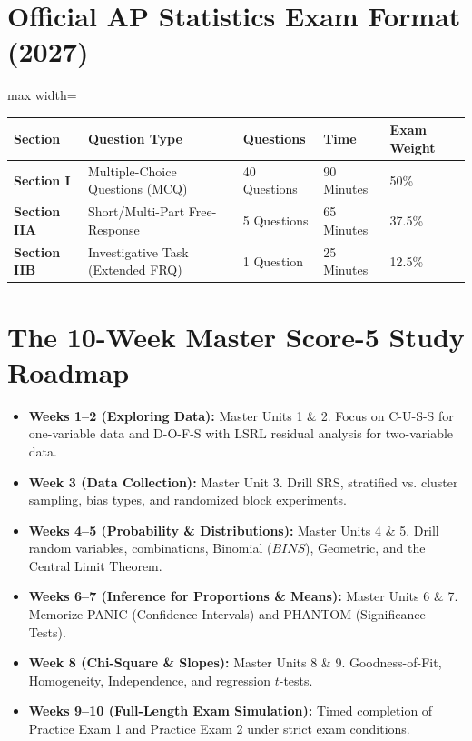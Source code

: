 \section*{Official AP Statistics Exam Format (2027)}
\begin{adjustbox}{max width=\linewidth}
\begin{tabular}{lllll}
\toprule
\textbf{Section} & \textbf{Question Type} & \textbf{Questions} & \textbf{Time} & \textbf{Exam Weight} \\
\midrule
\textbf{Section I} & Multiple-Choice Questions (MCQ) & 40 Questions & 90 Minutes & 50\% \\
\textbf{Section IIA} & Short/Multi-Part Free-Response & 5 Questions & 65 Minutes & 37.5\% \\
\textbf{Section IIB} & Investigative Task (Extended FRQ) & 1 Question & 25 Minutes & 12.5\% \\
\bottomrule
\end{tabular}
\end{adjustbox}

\section*{The 10-Week Master Score-5 Study Roadmap}
\begin{itemize}[leftmargin=1.2em]
  \item \textbf{Weeks 1--2 (Exploring Data):} Master Units 1 \& 2. Focus on C-U-S-S for one-variable data and D-O-F-S with LSRL residual analysis for two-variable data.
  \item \textbf{Week 3 (Data Collection):} Master Unit 3. Drill SRS, stratified vs. cluster sampling, bias types, and randomized block experiments.
  \item \textbf{Weeks 4--5 (Probability \& Distributions):} Master Units 4 \& 5. Drill random variables, combinations, Binomial ($BINS$), Geometric, and the Central Limit Theorem.
  \item \textbf{Weeks 6--7 (Inference for Proportions \& Means):} Master Units 6 \& 7. Memorize PANIC (Confidence Intervals) and PHANTOM (Significance Tests).
  \item \textbf{Week 8 (Chi-Square \& Slopes):} Master Units 8 \& 9. Goodness-of-Fit, Homogeneity, Independence, and regression $t$-tests.
  \item \textbf{Weeks 9--10 (Full-Length Exam Simulation):} Timed completion of Practice Exam 1 and Practice Exam 2 under strict exam conditions.
\end{itemize}
\clearpage
